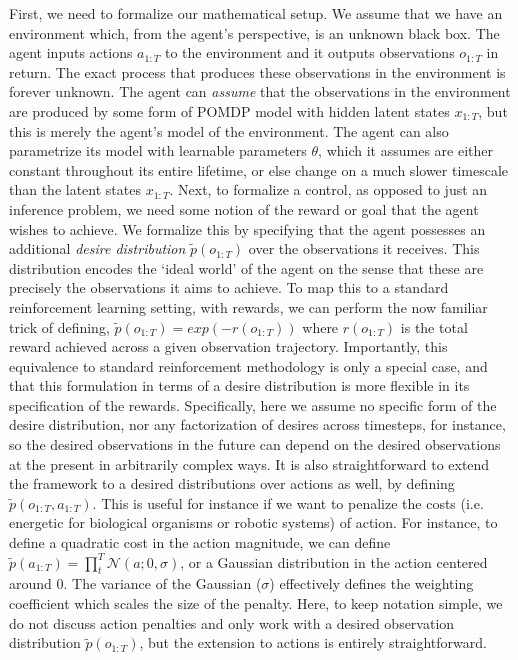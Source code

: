 First, we need to formalize our mathematical setup. We assume that we have an environment which, from the agent's perspective, is an unknown black box. The agent inputs actions $a_{1:T}$ to the environment and it outputs observations $o_{1:T}$ in return. The exact process that produces these observations in the environment is forever unknown. The agent can \emph{assume} that the observations in the environment are produced by some form of POMDP model with hidden latent states $x_{1:T}$, but this is merely the agent's model of the environment. The agent can also parametrize its model with learnable parameters $\theta$, which it assumes are either constant throughout its entire lifetime, or else change on a much slower timescale than the latent states $x_{1:T}$. Next, to formalize a control, as opposed to just an inference problem, we need some notion of the reward or goal that the agent wishes to achieve. We formalize this by specifying that the agent possesses an additional \emph{desire distribution} $\tilde{p}(o_{1:T})$ over the observations it receives. This distribution encodes the `ideal world' of the agent on the sense that these are precisely the observations it aims to achieve. To map this to a standard reinforcement learning setting, with rewards, we can perform the now familiar trick of defining, $\tilde{p}(o_{1:T}) = exp(-r(o_{1:T}))$ where $r(o_{1:T})$ is the total reward achieved across a given observation trajectory. Importantly, this equivalence to standard reinforcement methodology is only a special case, and that this formulation in terms of a desire distribution is more flexible in its specification of the rewards. Specifically, here we assume no specific form of the desire distribution, nor any factorization of desires across timesteps, for instance, so the desired observations in the future can depend on the desired observations at the present in arbitrarily complex ways. It is also straightforward to extend the framework to a desired distributions over actions as well, by defining $\tilde{p}(o_{1:T}, a_{1:T})$. This is useful for instance if we want to penalize the costs (i.e. energetic for biological organisms or robotic systems) of action. For instance, to define a quadratic cost in the action magnitude, we can define $\tilde{p}(a_{1:T}) = \prod_t^T \mathcal{N}(a; 0, \sigma)$, or a Gaussian distribution in the action centered around 0. The variance of the Gaussian ($\sigma$) effectively defines the weighting coefficient which scales the size of the penalty. Here, to keep notation simple, we do not discuss action penalties and only work with a desired observation distribution $\tilde{p}(o_{1:T})$, but the extension to actions is entirely straightforward.

